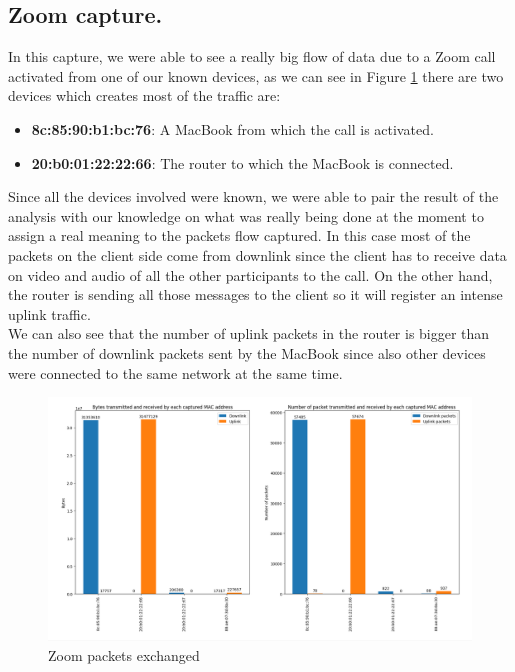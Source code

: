 \subsection{Zoom capture.}
In this capture, we were able to see a really big flow of data due to a Zoom call activated from 
one of our known devices, as we can see in Figure \ref{fig:Zoom_packets} there are two devices which
creates most of the traffic are:
\begin{itemize}
    \item \textbf{8c:85:90:b1:bc:76}: A MacBook from which the call is activated. 
    \item \textbf{20:b0:01:22:22:66}: The router to which the MacBook is connected. 
\end{itemize}
Since all the devices involved were known, we were able to pair the result of the analysis with our 
knowledge on what was really being done at the moment to assign a real meaning to the packets flow 
captured. In this case most of the packets on the client side come from downlink since the client 
has to receive data on video and audio of all the other participants to the call. On the other hand,
the router is sending all those messages to the client so it will register an intense uplink traffic.\\
We can also see that the number of uplink packets in the router is bigger than the number of downlink
packets sent by the MacBook since also other devices were connected to the same network at the same
time. 
\begin{figure}[h]
    \includegraphics[width=\textwidth]{Graphs/Zoom_bytes_packets.png}
    \caption{Zoom packets exchanged}
    \label{fig:Zoom_packets}
\end{figure}


